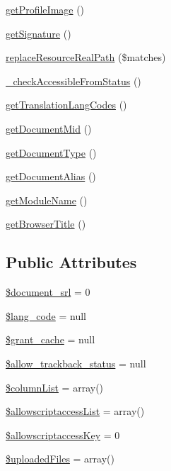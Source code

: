 \begin{DoxyCompactItemize}
\hyperlink{classdocumentItem_afb95c0b0d6d9106c737d8eeb51a3c834}{get\+Profile\+Image} ()
\item 
\hyperlink{classdocumentItem_a03b199ae0def81ea3a9067bbb0186f17}{get\+Signature} ()
\item 
\hyperlink{classdocumentItem_a47d377b1f8ae94615b363f4f00bc94fc}{replace\+Resource\+Real\+Path} (\$matches)
\item 
\hyperlink{classdocumentItem_a16bc4bb18f4e29b0244e647eb89e2f45}{\+\_\+check\+Accessible\+From\+Status} ()
\item 
\hyperlink{classdocumentItem_afd284f32681755444c28e93c14f55c28}{get\+Translation\+Lang\+Codes} ()
\item 
\hyperlink{classdocumentItem_ae8d90b15c65199e9acb4622b3da43119}{get\+Document\+Mid} ()
\item 
\hyperlink{classdocumentItem_a393ee98eeada92d1bd3b41f5018f746e}{get\+Document\+Type} ()
\item 
\hyperlink{classdocumentItem_adad3fafeaac19dfed4bea9e5709677d4}{get\+Document\+Alias} ()
\item 
\hyperlink{classdocumentItem_abc1a8bc25ecdbf936fba6e62b773b01c}{get\+Module\+Name} ()
\item 
\hyperlink{classdocumentItem_a386ced6121facbf9f54c2675afb8a037}{get\+Browser\+Title} ()
\end{DoxyCompactItemize}
\subsection*{Public Attributes}
\begin{DoxyCompactItemize}
\item 
\hyperlink{classdocumentItem_a87159d1cf24944d081646e6fe4f7e0f6}{\$document\+\_\+srl} = 0
\item 
\hyperlink{classdocumentItem_a5fa7aa5d52f248116250e95126e8ab87}{\$lang\+\_\+code} = null
\item 
\hyperlink{classdocumentItem_af1bde72448d1519839d6d07ff873effe}{\$grant\+\_\+cache} = null
\item 
\hyperlink{classdocumentItem_aaf08d80bedc01fc0fc0370677a4ba9cc}{\$allow\+\_\+trackback\+\_\+status} = null
\item 
\hyperlink{classdocumentItem_a244e1382304e15c5ae29e3311ef8e865}{\$column\+List} = array()
\item 
\hyperlink{classdocumentItem_a3b10cc840f3a20580d3ab2269ef24df3}{\$allowscriptaccess\+List} = array()
\item 
\hyperlink{classdocumentItem_ab4273ebe05df985235bf651d918bd4f8}{\$allowscriptaccess\+Key} = 0
\item 
\hyperlink{classdocumentItem_a70d4321ea0edfb6c1fb0775ced8a6b41}{\$uploaded\+Files} = array()
\end{DoxyCompactItemize}


